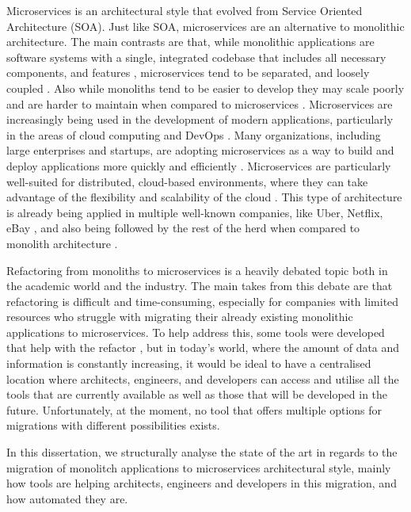 Microservices is an architectural style that evolved from Service Oriented
Architecture (SOA). Just like SOA, microservices are an alternative to
monolithic architecture. The main contrasts are that, while monolithic
applications are software systems with a single, integrated codebase that
includes all necessary components, and features
\cite{kazanavivcius2019migrating}, microservices tend to be separated, and
loosely coupled \cite{newman2021building}. Also while monoliths tend to be
easier to develop they may scale poorly and are harder to maintain when
compared to microservices \cite{newman2019monolith}. Microservices are
increasingly being used in the development of modern applications, particularly
in the areas of cloud computing and DevOps \cite{ren2018migrating}. Many
organizations, including large enterprises and startups, are adopting
microservices as a way to build and deploy applications more quickly and
efficiently \cite{richardson-microservices}. Microservices are particularly
well-suited for distributed, cloud-based environments, where they can take
advantage of the flexibility and scalability of the cloud
\cite{fowler-microservices-prerequisites}. This type of architecture is already
being applied in multiple well-known companies, like Uber, Netflix, eBay
\cite{microservices-users}, and also being followed by the rest of the herd
when compared to monolith architecture \cite{taibi2017processes}.

Refactoring from monoliths to microservices is a heavily debated topic both in
the academic world and the industry. The main takes from this debate are that
refactoring is difficult and time-consuming, especially for companies with
limited resources who struggle with migrating their already existing monolithic
applications to microservices. To help address this, some tools were developed
that help with the refactor , but in today's world, where the
amount of data and information is constantly increasing, it would be ideal to
have a centralised location where architects, engineers, and developers can
access and utilise all the tools that are currently available as well as those
that will be developed in the future. Unfortunately, at the moment, no tool
that offers multiple options for migrations with different possibilities
exists.

In this dissertation, we structurally analyse the state of the art in regards to the
migration of monolitch applications to microservices architectural style,
mainly how tools are helping architects, engineers and developers in this
migration, and how automated they are.

